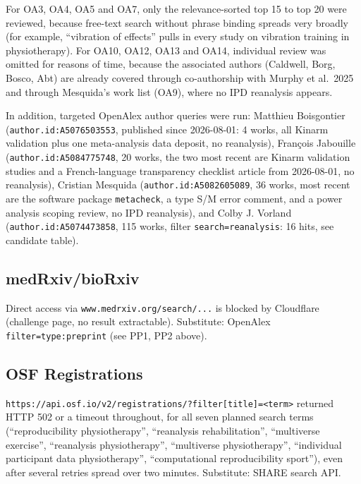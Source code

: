 For OA3, OA4, OA5 and OA7, only the relevance-sorted top 15 to top 20 were reviewed, because free-text search without phrase binding spreads very broadly (for example, ``vibration of effects'' pulls in every study on vibration training in physiotherapy). For OA10, OA12, OA13 and OA14, individual review was omitted for reasons of time, because the associated authors (Caldwell, Borg, Bosco, Abt) are already covered through co-authorship with Murphy et al.~2025 and through Mesquida's work list (OA9), where no IPD reanalysis appears.

In addition, targeted OpenAlex author queries were run: Matthieu Boisgontier (\texttt{author.id:A5076503553}, published since 2026-08-01: 4 works, all Kinarm validation plus one meta-analysis data deposit, no reanalysis), François Jabouille (\texttt{author.id:A5084775748}, 20 works, the two most recent are Kinarm validation studies and a French-language transparency checklist article from 2026-08-01, no reanalysis), Cristian Mesquida (\texttt{author.id:A5082605089}, 36 works, most recent are the software package \texttt{metacheck}, a type S/M error comment, and a power analysis scoping review, no IPD reanalysis), and Colby J. Vorland (\texttt{author.id:A5074473858}, 115 works, filter \texttt{search=reanalysis}: 16 hits, see candidate table).

\subsection{medRxiv/bioRxiv}\label{medrxivbiorxiv}

Direct access via \texttt{www.medrxiv.org/search/...} is blocked by Cloudflare (challenge page, no result extractable). Substitute: OpenAlex \texttt{filter=type:preprint} (see PP1, PP2 above).

\subsection{OSF Registrations}\label{osf-registrations}

\texttt{https://api.osf.io/v2/registrations/?filter{[}title{]}=\textless{}term\textgreater{}} returned HTTP 502 or a timeout throughout, for all seven planned search terms (``reproducibility physiotherapy'', ``reanalysis rehabilitation'', ``multiverse exercise'', ``reanalysis physiotherapy'', ``multiverse physiotherapy'', ``individual participant data physiotherapy'', ``computational reproducibility sport''), even after several retries spread over two minutes. Substitute: SHARE search API.


